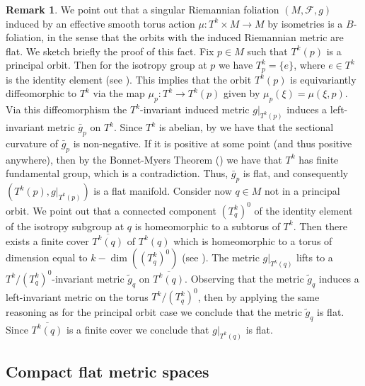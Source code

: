 \documentclass[12pt,a4paper,reqno]{amsart}
\theoremstyle{definition}
\newtheorem{rmk}[theorem]{Remark}
\numberwithin{equation}{section}
\newcommand{\fol}{\mathcal{F}}
\begin{document}
\begin{rmk}
We point out that a singular Riemannian foliation $(M,\fol,g)$ induced by an effective smooth torus action $\mu\colon T^k\times M\to M$ by isometries is a $B$-foliation, in the sense that the orbits with the induced Riemannian metric are flat. We sketch briefly the proof of this fact.  Fix $p\in M$ such that $T^{k}(p)$ is a principal orbit. Then for the isotropy group at $p$ we have $T^k_p=\{e\}$, where $e\in T^k$ is the identity element (see \cite[Example 3.4.3]{ZillerNotes}). This implies that the orbit $T^k(p)$ is equivariantly diffeomorphic to $T^k$ via the map $\mu_p\colon T^k\to T^k(p)$ given by $\mu_p(\xi)= \mu(\xi,p)$. Via this diffeomorphism the $T^k$-invariant induced metric $g|_{T^k(p)}$ induces a left-invariant metric $\bar{g}_p$ on $T^k$. Since $T^k$ is abelian, by \cite[Corollary 1.3]{Milnor1976} we have that the sectional curvature of $\bar{g}_p$ is non-negative. If it is positive at some point (and thus positive anywhere), then by the Bonnet-Myers Theorem (\cite[Chapter 9, 3.1 Theorem]{doCarmo}) we have that $T^k$ has finite fundamental group, which is a contradiction. Thus, $\bar{g}_p$ is flat, and consequently $(T^k(p),g|_{T^k(p)})$ is a flat manifold. Consider now $q\in M$ not in a principal orbit. We point out that a connected component $(T^k_q)^0$ of the identity element of the isotropy subgroup at $q$ is homeomorphic to a subtorus of $T^k$. Then there exists a finite cover $\overline{T^k(q)}$ of $T^k(q)$ which is homeomorphic to a torus of dimension equal to $k-\dim((T^k_q)^0)$ (see \citep[Example 2.4]{GalazGarciaRadeschi2015}). The metric $g|_{T^k(q)}$ lifts to a $T^k/(T^k_q)^0$-invariant metric $\tilde{g}_q$ on $\overline{T^k(q)}$. Observing that the metric $\tilde{g}_q$ induces a left-invariant metric on the torus $T^k/(T^k_q)^0$, then by applying the same reasoning as for the principal orbit case we conclude that the metric $\tilde{g}_q$ is flat. Since $\overline{T^k(q)}$ is a finite cover we conclude that $g|_{T^k(q)}$ is flat.
\end{rmk}

\subsection{Compact flat metric spaces}\label{S: Flat}
\end{document}
